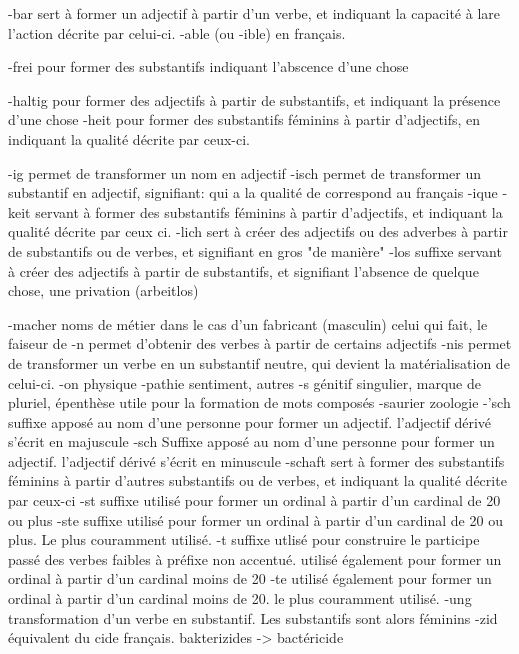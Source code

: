 -bar         sert à former un adjectif à partir d'un verbe,
             et indiquant la capacité à lare l'action décrite par celui-ci.
             -able (ou -ible) en français.

-frei        pour former des substantifs indiquant l'abscence d'une chose

-haltig      pour former des adjectifs à partir de substantifs, et indiquant la présence d'une chose
-heit        pour former des substantifs féminins à partir d'adjectifs,
             en indiquant la qualité décrite par ceux-ci.

-ig          permet de transformer un nom en adjectif
-isch        permet de transformer un substantif en adjectif, signifiant: qui a la qualité de
             correspond au français -ique
-keit        servant à former des substantifs féminins à partir d'adjectifs,
             et indiquant la qualité décrite par ceux ci.
-lich        sert à créer des adjectifs ou des adverbes à partir de substantifs ou de verbes,
             et signifiant en gros "de manière"
-los         suffixe servant à créer des adjectifs à partir de substantifs,
             et signifiant l'absence de quelque chose, une privation (arbeitlos)

-macher      noms de métier dans le cas d'un fabricant (masculin)
             celui qui fait, le faiseur de
-n           permet d'obtenir des verbes à partir de certains adjectifs
-nis         permet de transformer un verbe en un substantif neutre,
             qui devient la matérialisation de celui-ci.
-on          physique
-pathie      sentiment, autres
-s           génitif singulier, marque de pluriel, épenthèse utile pour la formation de mots composés
-saurier     zoologie
-’sch        suffixe apposé au nom d'une personne pour former un adjectif.
             l'adjectif dérivé s'écrit en majuscule
-sch         Suffixe apposé au nom d'une personne pour former un adjectif.
             l'adjectif dérivé s'écrit en minuscule
-schaft      sert à former des substantifs féminins à partir d'autres substantifs ou de verbes,
             et indiquant la qualité décrite par ceux-ci
-st          suffixe utilisé pour former un ordinal à partir d'un cardinal de 20 ou plus
-ste         suffixe utilisé pour former un ordinal à partir d'un cardinal de 20 ou plus.
             Le plus couramment utilisé.
-t           suffixe utlisé pour construire le participe passé des verbes faibles
             à préfixe non accentué.
             utilisé également pour former un ordinal à partir d'un cardinal moins de 20
-te          utilisé également pour former un ordinal à partir d'un cardinal moins de 20.
             le plus couramment utilisé.
-ung         transformation d'un verbe en substantif. Les substantifs sont alors féminins
-zid         équivalent du cide français. bakterizides -> bactéricide

